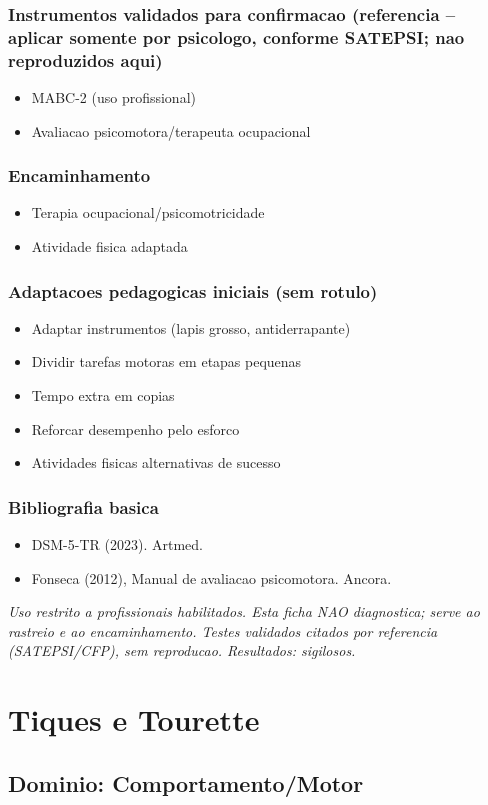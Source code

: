 \documentclass[a4paper,11pt]{book}
\newcommand{\avisolegal}{\par\medskip\noindent\footnotesize\itshape
\color{cinza}Uso restrito a profissionais habilitados. Esta ficha NAO diagnostica;
serve ao rastreio e ao encaminhamento. Testes validados citados por referencia
(SATEPSI/CFP), sem reproducao. Resultados: sigilosos.\color{black}\par}
\begin{document}
\subsection*{Instrumentos validados para confirmacao (referencia -- aplicar somente por psicologo, conforme SATEPSI; nao reproduzidos aqui)}
\begin{itemize}
\item MABC-2 (uso profissional)
\item Avaliacao psicomotora/terapeuta ocupacional
\end{itemize}
\subsection*{Encaminhamento}
\begin{itemize}
\item Terapia ocupacional/psicomotricidade
\item Atividade fisica adaptada
\end{itemize}
\subsection*{Adaptacoes pedagogicas iniciais (sem rotulo)}
\begin{itemize}
\item Adaptar instrumentos (lapis grosso, antiderrapante)
\item Dividir tarefas motoras em etapas pequenas
\item Tempo extra em copias
\item Reforcar desempenho pelo esforco
\item Atividades fisicas alternativas de sucesso
\end{itemize}
\subsection*{Bibliografia basica}
\begin{itemize}
\item DSM-5-TR (2023). Artmed.
\item Fonseca (2012), Manual de avaliacao psicomotora. Ancora.
\end{itemize}
\avisolegal


\chapter{Tiques e Tourette}
\section*{Dominio: Comportamento/Motor}
\end{document}
